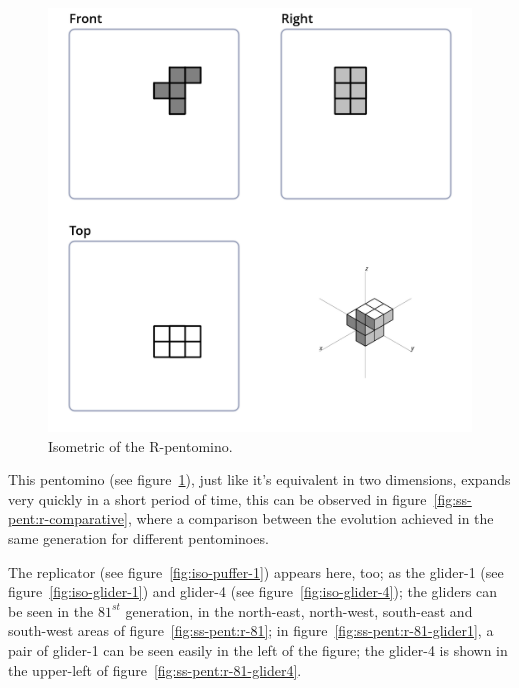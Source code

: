 \begin{figure}[H]
	\centering
	\includegraphics[scale=0.3]{iso_diagrams/r.png}
	\caption{Isometric of the R-pentomino.}
	\label{fig:iso-pent-r}
\end{figure}

This pentomino (see figure~\ref{fig:iso-pent-r}), just like it's equivalent in
two dimensions, expands very quickly in a short period of time, this can be
observed in figure~\ref{fig:ss-pent:r-comparative}, where a comparison between
the evolution achieved in the same generation for different pentominoes.

The replicator (see figure~\ref{fig:iso-puffer-1}) appears here, too; as the
glider-1 (see figure~\ref{fig:iso-glider-1}) and glider-4 (see
figure~\ref{fig:iso-glider-4}); the gliders can be seen in the  $81^{st}$
generation, in the north-east, north-west, south-east and south-west areas of
figure~\ref{fig:ss-pent:r-81}; in figure~\ref{fig:ss-pent:r-81-glider1}, a
pair of glider-1 can be seen easily in the left of the figure; the glider-4 is
shown in the upper-left of figure~\ref{fig:ss-pent:r-81-glider4}.

